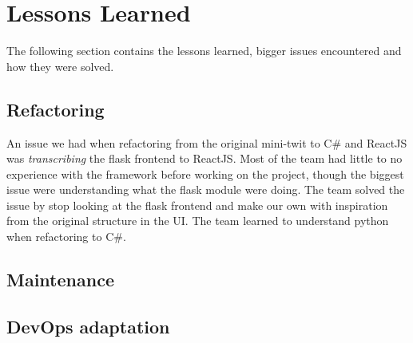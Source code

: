 \section{Lessons Learned}
\label{sec:lessons_learned}
The following section contains the lessons learned, bigger issues encountered and how they were solved.
\subsection{Refactoring}
An issue we had when refactoring from the original mini-twit to C\# and ReactJS was \textit{transcribing} the flask frontend to ReactJS. Most of the team had little to no experience with the framework before working on the project, though the biggest issue were understanding what the flask module were doing. The team solved the issue by stop looking at the flask frontend and make our own with inspiration from the original structure in the UI. The team learned to understand python when refactoring to C\#. 


\subsection{Maintenance}


\subsection{DevOps adaptation}

